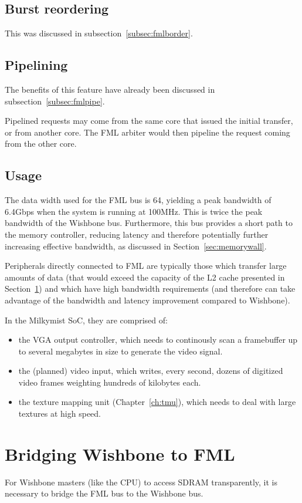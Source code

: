 \documentclass[a4paper,11pt]{kthesis}
\begin{document}
\subsection{Burst reordering}
This was discussed in subsection~\ref{subsec:fmlborder}.

\subsection{Pipelining}
The benefits of this feature have already been discussed in subsection~\ref{subsec:fmlpipe}.

Pipelined requests may come from the same core that issued the initial transfer, or from another core. The FML arbiter would then pipeline the request coming from the other core.

\subsection{Usage}
The data width used for the FML bus is 64, yielding a peak bandwidth of 6.4Gbps when the system is running at 100MHz. This is twice the peak bandwidth of the Wishbone bus. Furthermore, this bus provides a short path to the memory controller, reducing latency and therefore potentially further increasing effective bandwidth, as discussed in Section~\ref{sec:memorywall}.

Peripherals directly connected to FML are typically those which transfer large amounts of data (that would exceed the capacity of the L2 cache presented in Section~\ref{sec:fmlbrg}) and which have high bandwidth requirements (and therefore can take advantage of the bandwidth and latency improvement compared to Wishbone).

In the Milkymist SoC, they are comprised of:
\begin{itemize}
\item the VGA output controller, which needs to continously scan a framebuffer up to several megabytes in size to generate the video signal.
\item the (planned) video input, which writes, every second, dozens of digitized video frames weighting hundreds of kilobytes each.
\item the texture mapping unit (Chapter~\ref{ch:tmu}), which needs to deal with large textures at high speed.
\end{itemize}

\section{Bridging Wishbone to FML}
\label{sec:fmlbrg}
For Wishbone masters (like the CPU) to access SDRAM transparently, it is necessary to bridge the FML bus to the Wishbone bus.
\end{document}
